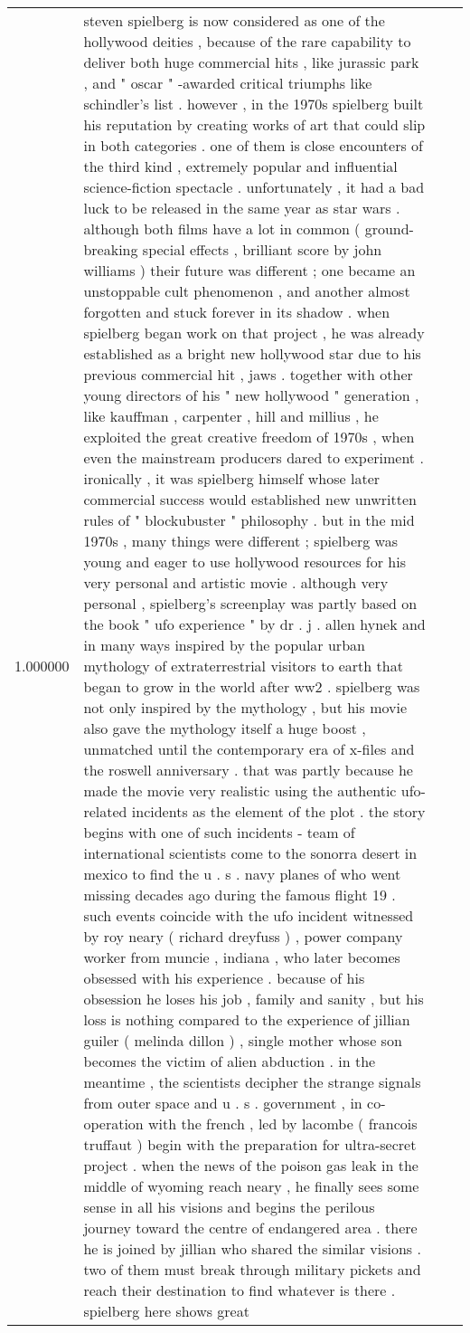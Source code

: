 \begin{tabular}{r{1cm} p{0.4in} r{1cm} p{0.4in}}
1.000000 & steven spielberg is now considered as one of the hollywood deities , because of the rare capability to deliver both huge commercial hits , like jurassic park , and " oscar " -awarded critical triumphs like schindler's list .  however , in the 1970s spielberg built his reputation by creating works of art that could slip in both categories .  one of them is close encounters of the third kind , extremely popular and influential science-fiction spectacle .  unfortunately , it had a bad luck to be released in the same year as star wars .  although both films have a lot in common ( ground-breaking special effects , brilliant score by john williams ) their future was different ; one became an unstoppable cult phenomenon , and another almost forgotten and stuck forever in its shadow .  when spielberg began work on that project , he was already established as a bright new hollywood star due to his previous commercial hit , jaws .  together with other young directors of his " new hollywood " generation , like kauffman , carpenter , hill and millius , he exploited the great creative freedom of 1970s , when even the mainstream producers dared to experiment .  ironically , it was spielberg himself whose later commercial success would established new unwritten rules of " blockubuster " philosophy .  but in the mid 1970s , many things were different ; spielberg was young and eager to use hollywood resources for his very personal and artistic movie .  although very personal , spielberg's screenplay was partly based on the book " ufo experience " by dr . j . allen hynek and in many ways inspired by the popular urban mythology of extraterrestrial visitors to earth that began to grow in the world after ww2 .  spielberg was not only inspired by the mythology , but his movie also gave the mythology itself a huge boost , unmatched until the contemporary era of x-files and the roswell anniversary .  that was partly because he made the movie very realistic using the authentic ufo-related incidents as the element of the plot .  the story begins with one of such incidents - team of international scientists come to the sonorra desert in mexico to find the u . s . navy planes of who went missing decades ago during the famous flight 19 .  such events coincide with the ufo incident witnessed by roy neary ( richard dreyfuss ) , power company worker from muncie , indiana , who later becomes obsessed with his experience .  because of his obsession he loses his job , family and sanity , but his loss is nothing compared to the experience of jillian guiler ( melinda dillon ) , single mother whose son becomes the victim of alien abduction .  in the meantime , the scientists decipher the strange signals from outer space and u . s . government , in co-operation with the french , led by lacombe ( francois truffaut ) begin with the preparation for ultra-secret project .  when the news of the poison gas leak in the middle of wyoming reach neary , he finally sees some sense in all his visions and begins the perilous journey toward the centre of endangered area .  there he is joined by jillian who shared the similar visions .  two of them must break through military pickets and reach their destination to find whatever is there .  spielberg here shows great 
\end{tabular}
